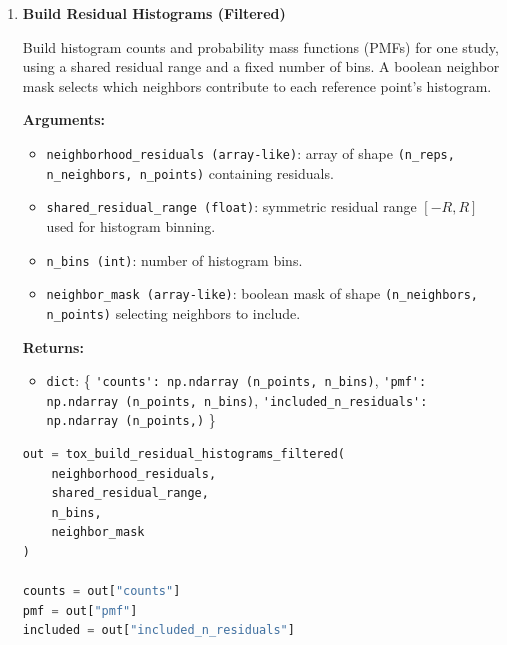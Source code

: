 \begin{enumerate}
        \begin{lstlisting}[language=Python, caption={Residual Histogram Construction}]
out = tox_build_residual_histograms(
    neighborhood_residuals,
    shared_residual_range,
    n_bins
)

counts = out["counts"]
pmf = out["pmf"]
included = out["included_n_residuals"]
        \end{lstlisting}

    \item \textbf{Build Residual Histograms (Filtered)}

        Build histogram counts and probability mass functions (PMFs) for one study, using a shared residual range and a fixed number of bins.  
        A boolean neighbor mask selects which neighbors contribute to each reference point’s histogram.

        \textbf{Arguments:}
        \begin{itemize}
            \item \lstinline!neighborhood_residuals (array-like)!: array of shape \lstinline!(n_reps, n_neighbors, n_points)! containing residuals.
            \item \lstinline!shared_residual_range (float)!: symmetric residual range \([-R, R]\) used for histogram binning.
            \item \lstinline!n_bins (int)!: number of histogram bins.
            \item \lstinline!neighbor_mask (array-like)!: boolean mask of shape \lstinline!(n_neighbors, n_points)! selecting neighbors to include.
        \end{itemize}

        \textbf{Returns:}
        \begin{itemize}
            \item \lstinline!dict!: \{
                \lstinline!'counts': np.ndarray (n_points, n_bins)!,  
                \lstinline!'pmf': np.ndarray (n_points, n_bins)!,  
                \lstinline!'included_n_residuals': np.ndarray (n_points,)!
            \}
        \end{itemize}

        \begin{lstlisting}[language=Python, caption={Filtered Residual Histogram Construction}]
out = tox_build_residual_histograms_filtered(
    neighborhood_residuals,
    shared_residual_range,
    n_bins,
    neighbor_mask
)

counts = out["counts"]
pmf = out["pmf"]
included = out["included_n_residuals"]
        \end{lstlisting}


\end{enumerate}
